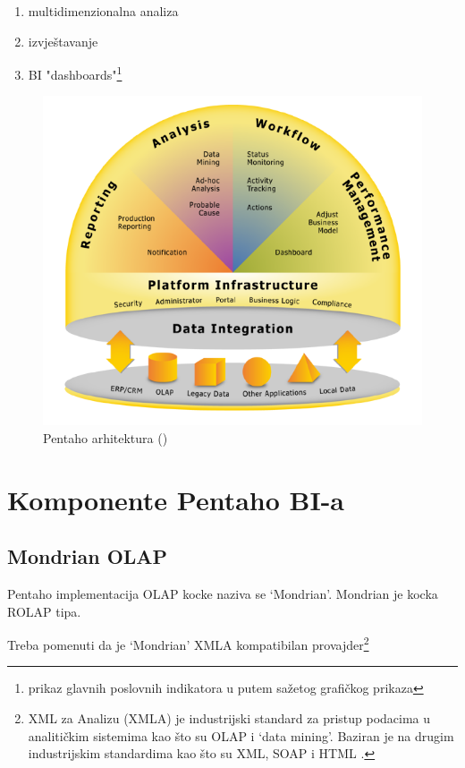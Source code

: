 \documentclass[times, utf8, seminar]{fit}
\begin{document}
\begin{enumerate}
 \item multidimenzionalna analiza
 \item izvještavanje
 \item BI "dashboards"\footnote{prikaz glavnih poslovnih indikatora u putem sažetog grafičkog prikaza}
\end{enumerate}

\begin{figure}[H]
\centering
\includegraphics[width=12cm]{img/pentaho_arhitektura_eric.png}
\caption{Pentaho arhitektura (\cite{web:eric})}
\end{figure}

\section{Komponente Pentaho BI-a}
\label{sect:pentaho}

\subsection{Mondrian OLAP}

Pentaho implementacija OLAP kocke naziva se `Mondrian'. Mondrian je kocka ROLAP tipa.

Treba pomenuti da je `Mondrian'  XMLA kompatibilan provajder\footnote{XML za Analizu (XMLA) je industrijski standard za pristup podacima u analitičkim sistemima kao što su OLAP i `data mining'. Baziran je na drugim industrijskim standardima kao što su XML, SOAP i HTML \cite{web:wikipedia:xmla}.}
\end{document}
